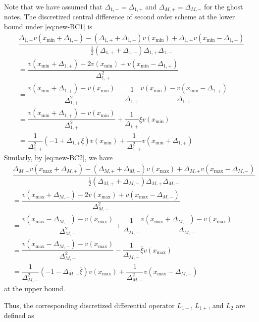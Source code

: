\documentclass[11pt]{article}
\begin{document}
Note that we have assumed that $\Delta_{1,-} = \Delta_{1,+}$ and $\Delta_{M,+} = \Delta_{M,-}$ for the ghost notes. The discretized central difference of second order scheme at the lower bound under \eqref{eq:new-BC1} is 
\begin{align}
&\dfrac{\Delta_{1,-} v( {x_{\min}} + \Delta_{1,+}) - (\Delta_{1,+} + \Delta_{1,-}) v({x_{\min}}) + \Delta_{1,+}  v( {x_{\min}} - \Delta_{1,-})}{\frac{1}{2}(\Delta_{1,+} + \Delta_{1,-}) \Delta_{1,+} \Delta_{1,-} } \\
&=
\dfrac{v ({x_{\min}}+\Delta_{1, +}) - 2 v({x_{\min}}) + v({x_{\min}}-\Delta_{1, +})}{\Delta_{1, +}^2} \\ 
&= \dfrac{v({x_{\min}} + \Delta_{1, +}) - v({x_{\min}})}{\Delta_{1, +}^2} - \dfrac{1}{\Delta_{1, +}}\dfrac{v({x_{\min}}) - v({x_{\min}}-\Delta_{1, +}) }{\Delta_{1, +}}  \\
&= \dfrac{v({x_{\min}} + \Delta_{1, +}) - v({x_{\min}})}{\Delta_{1, +}^2} + \dfrac{1}{\Delta_{i,+}} \underline{\xi} v({x_{\min}})  \\ 
&= \dfrac{1}{\Delta_{1, +}^2}  (- 1 + \Delta_{1, +} \underline{\xi}) v({x_{\min}})  + \dfrac{1}{\Delta_{1, +}^2}  v({x_{\min}} + \Delta_{1, +})  
\end{align}
Similarly, by \eqref{eq:new-BC2}, we have
\begin{align}
&\dfrac{\Delta_{M,-} v( {x_{\max}} + \Delta_{M,+}) - (\Delta_{M,+} + \Delta_{M,-}) v({x_{\max}} ) + \Delta_{M,+}  v( {x_{\max}} - \Delta_{M,-})}{\frac{1}{2}(\Delta_{M,+} + \Delta_{M,-}) \Delta_{M,+} \Delta_{M,-} } \\
&=\dfrac{v ({x_{\max}} + \Delta_{M,-}) - 2 v({x_{\max}} ) + v({x_{\max}} -\Delta_{M,-})}{\Delta_{M,-}^2} \\
&=   \dfrac{v({x_{\max}} - \Delta_{M,-}) - v({x_{\max}})}{\Delta_{M,-}^2} + \dfrac{1}{\Delta_{M,-}}\dfrac{ v({x_{\max}}+\Delta_{M,-}) - v ({x_{\max}}) }{\Delta_{M,-}}  \\
&= \dfrac{v({x_{\max}} - \Delta_{M,-}) - v({x_{\max}})}{\Delta_{M,-}^2}  - \dfrac{1}{\Delta_{M,-}} \overline{\xi} v({x_{\max}})  \\ 
&= \dfrac{1}{\Delta_{M,-}^2}  (- 1 - \Delta_{M,-} \overline{\xi}) v({x_{\max}})  + \dfrac{1}{\Delta_{M,-}^2}  v({x_{\max}} - \Delta_{M,-})  
\end{align}
at the upper bound.

Thus, the corresponding discretized differential operator $L_{1-}$, $L_{1+}$, and $L_2$ are defined as 
\end{document}
